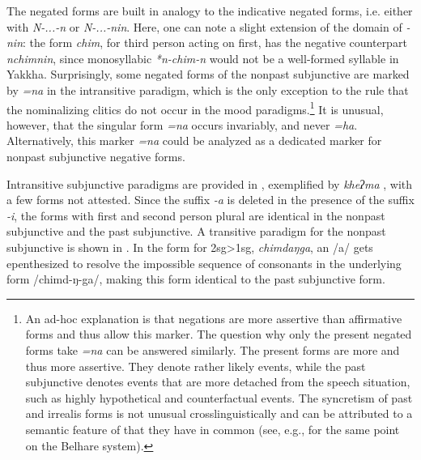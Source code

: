 The negated forms are built in analogy to the indicative negated forms, i.e. either with \emph{N-...-n} or \emph{N-...-nin}. Here, one can note a slight extension of the domain of \emph{-nin}: the form \emph{chim}, for third person acting on first, has the negative counterpart \emph{nchimnin}, since monosyllabic  \emph{*n-chim-n } would not be a well-formed syllable in Yakkha. Surprisingly, some negated forms of the nonpast subjunctive are marked by \emph{=na} in the intransitive paradigm, which is the only exception to the rule that the nominalizing clitics do not occur in the mood paradigms.\footnote{An ad-hoc explanation is that negations are more assertive than affirmative forms and thus allow this marker. The question why only the present negated forms take \emph{=na} can be answered similarly. The present forms are more  and thus more assertive. They denote rather likely events, while the past subjunctive denotes events that are more detached from the speech situation, such as highly hypothetical and counterfactual events. The syncretism of past and irrealis forms is not unusual crosslinguistically and can be attributed to a semantic feature of  that they have in common (see, e.g., \citet[88]{Bickel1996Aspect} for the same point on the Belhare system).}  It is unusual, however, that the singular form \emph{=na} occurs invariably, and never \emph{=ha}. Alternatively, this marker \emph{=na} could be analyzed as a dedicated marker for nonpast subjunctive negative forms.

Intransitive  subjunctive paradigms are provided in , exemplified by \emph{kheʔma} ,  with a few forms not attested. Since the suffix \emph{-a} is deleted in the presence of the suffix \emph{-i}, the forms with first and second person plural are identical in the nonpast subjunctive and the past subjunctive. A transitive paradigm for the nonpast subjunctive is shown in .  In the  form for {\sc 2sg>1sg}, \emph{chimdaŋga}, an /a/ gets epenthesized to resolve the impossible sequence of consonants in the underlying form /chimd-ŋ-ga/, making this form  identical to  the past subjunctive form.

